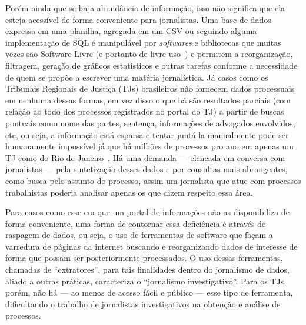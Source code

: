 Porém ainda que se haja abundância de informação, isso não significa que ela
esteja acessível de forma conveniente para jornalistas. Uma base de dados
expressa em uma planilha, agregada em um CSV ou seguindo alguma implementação
de SQL é manipulável por \textit{softwares} e bibliotecas que muitas vezes são
Software-Livre (e portanto de livre uso~\cite{def:free-software}) e permitem a
reorganização, filtragem, geração de gráficos estatísticos e outras tarefas
conforme a necessidade de quem se propõe a escrever uma matéria jornalística.
Já casos como os Tribunais Regionais de Justiça (TJs) brasileiros não fornecem
dados processuais em nenhuma dessas formas, em vez disso o que há são
resultados parciais (com relação ao todo dos processos registrados no portal do
TJ) a partir de buscas pontuais como nome das partes, sentença, informações de
advogados envolvidos, etc, ou seja, a informação está esparsa e tentar juntá-la
manualmente pode ser humanamente impossível já que há milhões de processos pro
ano em apenas um TJ como do Rio de Janeiro~\cite{tjrj}. Há uma demanda ---
elencada em conversa com jornalistas --- pela sintetização desses dados e por
consultas mais abrangentes, como busca pelo assunto do processo, assim um
jornalista que atue com processos trabalhistas poderia analisar apenas os que
dizem respeito essa área.

Para casos como esse em que um portal de informações não as disponibiliza de
forma conveniente, uma forma de contornar essa deficiência é através de
raspagem de dados, ou seja, o uso de ferramentas de software que façam a
varredura de páginas da internet buscando e reorganizando dados de interesse de
forma que possam ser posteriormente processados. O uso dessas ferramentas,
chamadas de ``extratores'', para tais finalidades dentro do jornalismo de
dados, aliado a outras práticas, caracteriza o ``jornalismo investigativo''.
Para os TJs, porém, não há --- ao menos de acesso fácil e público --- esse tipo
de ferramenta, dificultando o trabalho de jornalistas investigativos na
obtenção e análise de processos.
